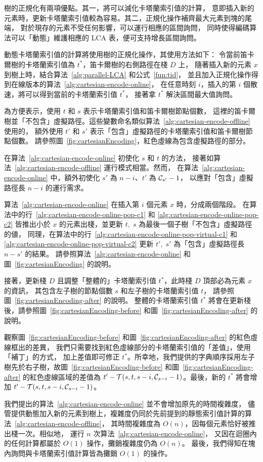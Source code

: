 樹的正規化有兩項優點。其一，將可以減化卡塔蘭索引值的計算，
意即插入新的元素時，更新卡塔蘭索引值較為容易。其二，正規化操作補齊最大元素到塊的尾端，
對於現存的元素不受任何影響，可以運行相應的區間詢問，
同時使得編碼算法可以「動態」維護相應的 LCA 表，便可支持增長區間詢問。

動態卡塔蘭索引值的計算將使用樹的正規化操作，其使用方法如下：
令當前笛卡爾樹的卡塔蘭索引值為 $t^*$，笛卡爾樹的右側路徑在棧 $D$ 上，
隨著插入新的元素 $x$ 到樹上時，結合算法~\ref{alg:parallel-LCA} 和公式~\ref{fun:tid}，
並且加入正規化操作得到在線版本的算法~\ref{alg:cartesian-encode-online}，
在任意時刻 $i$，插入的第 $i$ 個散速，將可以得到當前的卡塔蘭索引值 $t^*$，
接著拿 $t^*$ 解決區間最大值詢問。

為方便表示，使用 $t$ 和 $s$ 表示卡塔蘭索引值和笛卡爾樹節點個數，
這裡的笛卡爾樹並「不包含」虛擬路徑。這些變數命名類似算法~\ref{alg:cartesian-encode-offline} 使用的，
額外使用 $t'$ 和 $s'$ 表示「包含」虛擬路徑的卡塔蘭索引值和笛卡爾樹節點個數。
請參照圖~\ref{fig:cartesianEncoding}，紅色虛線為包含虛擬路徑的部分。

在算法~\ref{alg:cartesian-encode-online} 初使化 $s$ 和 $t$ 的方法，
接著如算法~\ref{alg:cartesian-encode-offline} 運行模式相當。然而，
在算法~\ref{alg:cartesian-encode-online} 中，額外初使化 $s'$ 為 $n-i$、$t'$ 為 ${\cal C}_{s'}-1$，
以應對「包含」虛擬路徑長 $n-i$ 的運行需求。

算法~\ref{alg:cartesian-encode-online} 在插入第 $i$ 個元素 $x$ 時，分成兩個階段。
在算法中的行~\ref{alg:cartesian-encode-online-pop-c1} 和 \ref{alg:cartesian-encode-online-pop-c2} 
皆推出小於 $x$ 的元素出棧，並更新 $t,\; s$ 為最後一個子樹「不包含」虛擬路徑的値，
同理，在算法中的行~\ref{alg:cartesian-encode-online-pop-virtual-c1} 和 \ref{alg:cartesian-encode-online-pop-virtual-c2} 
更新 $t', \; s'$ 為「包含」虛擬路徑長 $n-s'$ 的結果。
請參照算法~\ref{alg:cartesian-encode-online} 和圖~\ref{fig:cartesianEncoding} 的說明。



接著，更新棧 $D$ 且調整「整體的」卡塔蘭索引值 $t^*$，此時棧 $D$ 頂部必為元素 $x$ 的資訊，
其包含左子樹的節點個數 $s$ 和左子樹的卡塔蘭索引值 $t$，
請參照圖~\ref{fig:cartesianEncoding-after} 的說明。
整體的卡塔蘭索引值 $t^*$ 將會在更新棧後，請參照圖~\ref{fig:cartesianEncoding-before} 
和圖~\ref{fig:cartesianEncoding-after} 的說明。

觀察圖~\ref{fig:cartesianEncoding-before} 
和圖~\ref{fig:cartesianEncoding-after} 的紅色虛線框出的差異，
我們只需要找到紅色虛線部分的卡塔蘭索引值的「差值」，使用「補丁」的方式，
加上差值即可修正 $t^*$。所幸地，我們提供的字典順序採用左子樹先於右子樹，故圖~\ref{fig:cartesianEncoding-before} 
和圖~\ref{fig:cartesianEncoding-after} 的紅色虛線區域的差值為 $t' - {\cal T}(s, t, s - i,
{\cal C}_{s-i} - 1)$。最後，新的 $t^*$ 將會增加 $t' - {\cal T}(s, t, s - i, {\cal C}_{s-i} - 1)$。

我們提出的算法~\ref{alg:cartesian-encode-online} 並不會增加原先的時間複雜度，
儘管提供動態加入新的元素到樹上，複雜度仍同於先前提到的靜態索引值計算的算法~\ref{alg:cartesian-encode-offline}，
其時間複雜度為 $O(n)$，因每個元素恰好被推出棧一次。相似地，
運行 $n$ 次算法~\ref{alg:cartesian-encode-online}，
又因在迴圈內的任何計算都屬於 $O(1)$ 操作，攤銷複雜度仍為 $O(n)$。
最後，我們得知在塊內詢問與卡塔蘭索引值計算皆為攤銷 $O(1)$ 的操作。
